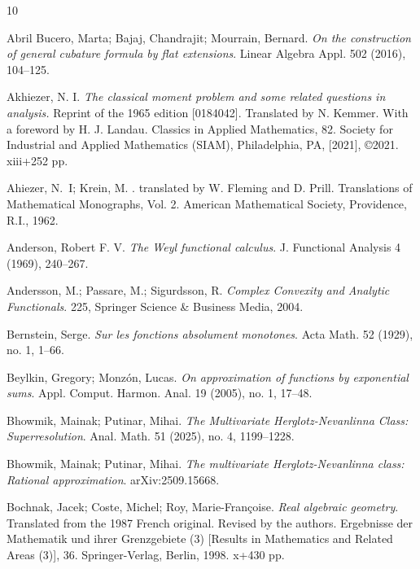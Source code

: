 \documentclass[11pt,reqno]{amsart}
\theoremstyle{plain}
\theoremstyle{definition}
\numberwithin{equation}{section}
\begin{document}
	
	\begin{thebibliography}{10}


Abril Bucero, Marta; Bajaj, Chandrajit; Mourrain, Bernard. {\em On the construction of general cubature formula by flat extensions}. Linear Algebra Appl. 502 (2016), 104–125.
		
        
		
        Akhiezer, N. I. {\it The classical moment problem and some related questions in analysis.} Reprint of the 1965 edition [0184042]. Translated by N. Kemmer. With a foreword by H. J. Landau. Classics in Applied Mathematics, 82. Society for Industrial and Applied Mathematics (SIAM), Philadelphia, PA, [2021], ©2021. xiii+252 pp.
		
		Ahiezer, N.~I; Krein, M.
		.
		\newblock translated by W. Fleming and D. Prill. Translations of Mathematical
		Monographs, Vol. 2. American Mathematical Society, Providence, R.I., 1962.

         Anderson, Robert F. V. {\em The Weyl functional calculus}. J. Functional Analysis 4 (1969), 240–267.

    
		 Andersson, M.; Passare, M.; Sigurdsson, R. {\em Complex Convexity and Analytic Functionals}. 225, Springer Science \& Business Media, 2004.
         
		
		 Bernstein, Serge. {\em Sur les fonctions absolument monotones}. Acta Math. 52 (1929), no. 1, 1–66. 		
		
		 Beylkin, Gregory; Monzón, Lucas. {\em On approximation of functions by exponential sums}.
		Appl. Comput. Harmon. Anal. 19 (2005), no. 1, 17–48.
		
		 Bhowmik, Mainak; Putinar, Mihai. {\em The Multivariate Herglotz-Nevanlinna Class: Superresolution}.
		Anal. Math. 51 (2025), no. 4, 1199–1228.
		
		 Bhowmik, Mainak; Putinar, Mihai. {\em The multivariate Herglotz-Nevanlinna class: Rational approximation}. arXiv:2509.15668.
		
		
		Bochnak, Jacek; Coste, Michel; Roy, Marie-Françoise. {\em Real algebraic geometry}. Translated from the 1987 French original. Revised by the authors. Ergebnisse der Mathematik und ihrer Grenzgebiete (3) [Results in Mathematics and Related Areas (3)], 36. Springer-Verlag, Berlin, 1998. x+430 pp.
		

\end{thebibliography}
\end{document}
